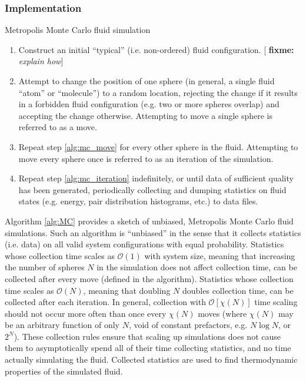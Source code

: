 \documentclass[11pt]{article}
\newcommand{\p}[1]{\left(#1\right)} %
\renewcommand{\sp}[1]{\left[#1\right]} %
\newenvironment{alg}
{\hrulefill\begin{enumerate}}
{\end{enumerate}\hrulefill}
\newcommand{\red}[1]{{\bf \color{red} #1}}
\newcommand{\fixme}[1]{[\red{fixme:} \emph{#1}]}
\begin{document}
\subsubsection{Implementation}
\label{sec:mc_implementation}

\begin{algorithm}[tb]
  \caption{Metropolis Monte Carlo fluid simulation}
  \label{alg:MC}
  \begin{alg}

  \item Construct an initial ``typical'' (i.e. non-ordered) fluid
    configuration. \fixme{explain how}

  \item Attempt to change the position of one sphere (in general, a
    single fluid ``atom'' or ``molecule'') to a random location,
    rejecting the change if it results in a forbidden fluid
    configuration (e.g. two or more spheres overlap) and accepting the
    change otherwise. Attempting to move a single sphere is referred
    to as a move. \label{alg:mc_move}

  \item Repeat step \ref{alg:mc_move} for every other sphere in the
    fluid. Attempting to move every sphere once is referred to as an
    iteration of the simulation.
    \label{alg:mc_iteration}

  \item Repeat step \ref{alg:mc_iteration} indefinitely, or until data
    of sufficient quality has been generated, periodically collecting
    and dumping statistics on fluid states (e.g. energy, pair
    distribution histograms, etc.) to data files.

  \end{alg}
\end{algorithm}

Algorithm \ref{alg:MC} provides a sketch of unbiased, Metropolis Monte
Carlo fluid simulations. Such an algorithm is ``unbiased'' in the
sense that it collects statistics (i.e. data) on all valid system
configurations with equal probability. Statistics whose collection
time scales as $\mathcal O\p{1}$ with system size, meaning that
increasing the number of spheres $N$ in the simulation does not affect
collection time, can be collected after every move (defined in the
algorithm). Statistics whose collection time scales as $\mathcal
O\p{N}$, meaning that doubling $N$ doubles collection time, can be
collected after each iteration. In general, collection with $\mathcal
O\sp{\chi\p{N}}$ time scaling should not occur more often than once
every $\chi\p{N}$ moves (where $\chi\p{N}$ may be an arbitrary
function of only $N$, void of constant prefactors, e.g. $N\log N$, or
$2^N$). These collection rules ensure that scaling up simulations does
not cause them to asymptotically spend all of their time collecting
statistics, and no time actually simulating the fluid. Collected
statistics are used to find thermodynamic properties of the simulated
fluid.
\end{document}
